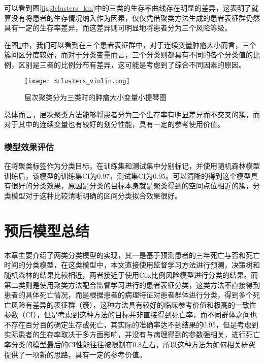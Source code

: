 可以看到图\ref{fig:3clusters_km}中的三类的生存率曲线存在明显的差异，这表明了就算没有将患者的生存情况纳入作为因素，仅仅凭借聚类方法生成的患者表征群仍然具有一定的生存率差异，而这差异则可明显地将患者分为三个风险等级。

在图\ref{fig:3clusters_violin}中，我们可以看到在三个患者表征群中，对于连续变量肿瘤大小而言，三个簇间区分度较好，而对于分类变量而言，三个分类则都具有不同的各个分类值的比例，区别是三者的比例分布有差异，这可能是考虑到了综合不同因素的原因。

\begin{figure}[!htbp]
    \centering
    \texttt{[image: 3clusters\_violin.png]}
    \caption{层次聚类分为三类时的肿瘤大小变量小提琴图} \label{fig:3clusters_violin}
\end{figure}

总体而言，层次聚类方法能够将患者分为三个生存率有明显差异而不交叉的簇，而对于其中的连续变量也有较好的划分性能，具有一定的参考使用价值。

\subsubsection{模型效果评估}

在将聚类标签作为分类目标，在训练集和测试集中分别标记，并使用随机森林模型训练后，该模型的训练集CI为0.97，测试集CI为0.95。可以清晰的得到这个模型具有很好的分类效果，原因是分类的目标本身就是聚类得到的空间点位相近的簇，分类模型对于这种比较清晰明确的区间分类拟合效果很好。

\section{预后模型总结}

本章主要介绍了两类分类模型的实现，其一是基于预测患者的三年死亡与否和死亡时间的分类模型，在这类模型中，本文直接使用监督学习方法进行预测，决策树和随机森林的结果比较相近，两者接近于使用Cox比例风险模型进行分类的结果。而第二类则是使用聚类方法配合监督学习进行的患者表征分类，这类方法不直接得到患者的具体死亡情况，而是根据患者的病理特征对患者群体进行分类，得到多个死亡风险有差异的表征群（簇），这种方法具有较好的临床参考价值和极高的一致性参数（CI），但是考虑到这种方法的目标并非直接得到死亡率，而不同群体之间也不存在百分百的确定生存或死亡，其实际的准确率达不到结果的0.95，但是考虑到实际患者的生存率取决于多方面影响，并没有与病理得到的参数强相关，进行死亡率分类的模型最后的CI性能往往被限制在0.8左右，所以这种方法为如何相关研究提供了一项新的思路，具有一定的参考价值。